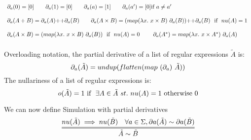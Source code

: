 \documentclass[a4paper,UKenglish,cleveref, autoref, thm-restate]{lipics-v2021}
\begin{document}
\begin{definition}
  \begin{displaymath}
    \begin{array}{lll}
\pd{a}{0} = [0] \qquad \pd{a}{1} = [0] \qquad \pd{a}{a} = [1] \qquad \pd{a}{a'} = [0]\text{if}~a \neq a'\\\\
\pd{a}{A + B} = \cat{\pd{a}{A}}{\pd{a}{B}} \qquad \pd{a}{A \times B} = \cat{(\mathsf{map }(\lambda x.~x \times B)~\pd{a}{B})}{\pd{a}{B}} ~\text{ if }~\mynu{A} = 1~\\\\
\pd{a}{A \times B} = (\mathsf{map }(\lambda x.~x \times B)~\pd{a}{B}) ~\text{ if }~\mynu{A} = 0~ 
\qquad \pd{a}{A^*} = \mathsf{map }(\lambda x.~x \times A^*)~\pd{a}{A}  \\\\
    \end{array}
  \end{displaymath}
Overloading notation, the partial derivative of a list of regular expressions $\tilde{A}$ is:
\[\pd{a}{\tilde{A}} = \mathsf{undup}(\mathsf{flatten}(\mymap{\partial_a}{\tilde{A}}))\]
The nullariness of a list of regular expressions is:
\[\myo{\tilde{A}} = 1 ~\text{if }~\exists A \in \tilde{A}~st. ~ \mynu{A}=1 \text{ otherwise } 0\]
\end{definition}
We can now define Simulation with partial derivatives
\[\infer={\tilde{A} \sim \tilde{B}}{\mynu{\tilde{A}} \implies \mynu{\tilde{B}} & \forall a \in \Sigma, \mypar{a}{\tilde{A}} \sim \mypar{a}{\tilde{B}} }\]
\end{document}
